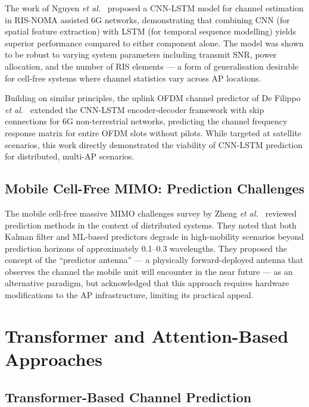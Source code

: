 \documentclass[12pt,a4paper]{article}
\begin{document}
The work of Nguyen \textit{et al.}~\cite{Nguyen2023cnnlstm} proposed
a CNN-LSTM model for channel estimation in RIS-NOMA assisted 6G
networks, demonstrating that combining CNN (for spatial feature
extraction) with LSTM (for temporal sequence modelling) yields superior
performance compared to either component alone. The model was shown to
be robust to varying system parameters including transmit SNR, power
allocation, and the number of RIS elements --- a form of generalisation
desirable for cell-free systems where channel statistics vary across
AP locations.

Building on similar principles, the uplink OFDM channel predictor
of De Filippo \textit{et al.}~\cite{DeFilippo2024cellfree} extended
the CNN-LSTM encoder-decoder framework with skip connections for 6G
non-terrestrial networks, predicting the channel frequency response
matrix for entire OFDM slots without pilots. While targeted at
satellite scenarios, this work directly demonstrated the viability of
CNN-LSTM prediction for distributed, multi-AP scenarios.

\subsection{Mobile Cell-Free MIMO: Prediction Challenges}

The mobile cell-free massive MIMO challenges survey by Zheng
\textit{et al.}~\cite{Zheng2023mobile} reviewed prediction methods
in the context of distributed systems. They noted that both Kalman
filter and ML-based predictors degrade in high-mobility scenarios
beyond prediction horizons of approximately 0.1--0.3 wavelengths.
They proposed the concept of the ``predictor antenna'' --- a
physically forward-deployed antenna that observes the channel the
mobile unit will encounter in the near future --- as an alternative
paradigm, but acknowledged that this approach requires hardware
modifications to the AP infrastructure, limiting its practical appeal.

\section{Transformer and Attention-Based Approaches}

\subsection{Transformer-Based Channel Prediction}
\end{document}
